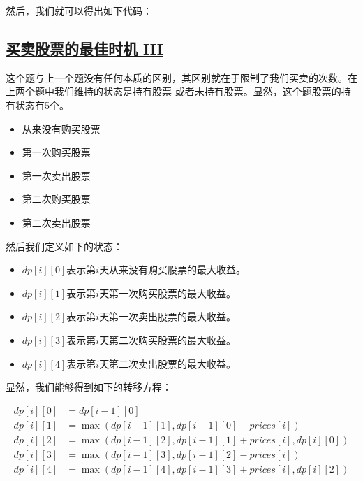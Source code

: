 \documentclass[../../main.tex]{subfiles}
\begin{document}
然后，我们就可以得出如下代码：



\subsection{\href{https://leetcode-cn.com/problems/best-time-to-buy-and-sell-stock-iii/}{买卖股票的最佳时机 III}}

这个题与上一个题没有任何本质的区别，其区别就在于限制了我们买卖的次数。在上两个题中我们维持的状态是持有股票
或者未持有股票。显然，这个题股票的持有状态有5个。

\begin{itemize}
  \item 从来没有购买股票
  \item 第一次购买股票
  \item 第一次卖出股票
  \item 第二次购买股票
  \item 第二次卖出股票
\end{itemize}

然后我们定义如下的状态：

\begin{itemize}
  \item $dp[i][0]$表示第$i$天从来没有购买股票的最大收益。
  \item $dp[i][1]$表示第$i$天第一次购买股票的最大收益。
  \item $dp[i][2]$表示第$i$天第一次卖出股票的最大收益。
  \item $dp[i][3]$表示第$i$天第二次购买股票的最大收益。
  \item $dp[i][4]$表示第$i$天第二次卖出股票的最大收益。
\end{itemize}

显然，我们能够得到如下的转移方程：

\begin{align*}
  dp[i][0] &= dp[i - 1][0] \\
  dp[i][1] &= \max(dp[i - 1][1], dp[i - 1][0] - prices[i]) \\
  dp[i][2] &= \max(dp[i - 1][2], dp[i - 1][1] + prices[i], dp[i][0]) \\
  dp[i][3] &= \max(dp[i - 1][3], dp[i - 1][2] - prices[i]) \\
  dp[i][4] &= \max(dp[i - 1][4], dp[i - 1][3] + prices[i], dp[i][2]) \\
\end{align*}
\end{document}
